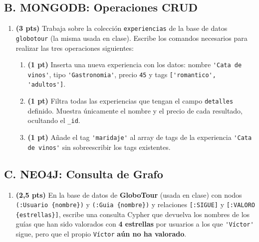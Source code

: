 \documentclass[a4paper,11pt]{article}
\begin{document}
\begin{Form}
\subsection*{B. MONGODB: Operaciones CRUD}
\begin{enumerate}[leftmargin=*, label=\textbf{P.M\arabic*:}, resume]
    \item \textbf{(3 pts)} Trabaja sobre la colección \texttt{experiencias} de la base de datos \texttt{globotour} (la misma usada en clase). Escribe los comandos necesarios para realizar las tres operaciones siguientes:
    \begin{enumerate}
        \item \textbf{(1 pt)} Inserta una nueva experiencia con los datos: nombre \lstinline{'Cata de vinos'}, tipo \lstinline{'Gastronomia'}, precio \texttt{45} y tags \lstinline{['romantico', 'adultos']}.
        \item \textbf{(1 pt)} Filtra todas las experiencias que tengan el campo \texttt{detalles} definido. Muestra únicamente el nombre y el precio de cada resultado, ocultando el \texttt{\_id}.
        \item \textbf{(1 pt)} Añade el tag \lstinline{'maridaje'} al array de tags de la experiencia \lstinline{'Cata de vinos'} sin sobreescribir los tags existentes.
    \end{enumerate}
\end{enumerate}

\subsection*{C. NEO4J: Consulta de Grafo}
\begin{enumerate}[leftmargin=*, label=\textbf{P.N\arabic*:}, resume]
    \item \textbf{(2,5 pts)} En la base de datos de \textbf{GloboTour} (usada en clase) con nodos \texttt{(:Usuario \{nombre\})} y \texttt{(:Guia \{nombre\})} y relaciones \texttt{[:SIGUE]} y \texttt{[:VALORO \{estrellas\}]}, escribe una consulta Cypher que devuelva los nombres de los guías que han sido valorados con \textbf{4 estrellas} por usuarios a los que \lstinline{'Víctor'} sigue, pero que el propio \texttt{Víctor} \textbf{aún no ha valorado}.
\end{enumerate}

\end{Form}
\end{document}
